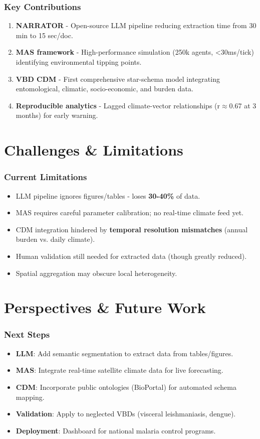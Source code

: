 \documentclass{beamer}
\begin{document}
\begin{frame}
    \frametitle{Key Contributions}
    \begin{enumerate}
        \item \textbf{NARRATOR} - Open-source LLM pipeline reducing extraction time from 30 min to 15 sec/doc.
        \item \textbf{MAS framework} - High-performance simulation (250k agents, <30ms/tick) identifying environmental tipping points.
        \item \textbf{VBD CDM} - First comprehensive star-schema model integrating entomological, climatic, socio-economic, and burden data.
        \item \textbf{Reproducible analytics} - Lagged climate-vector relationships (r$\approx$0.67 at 3 months) for early warning.
    \end{enumerate}
\end{frame}

\section{Challenges \& Limitations}
\begin{frame}
    \frametitle{Current Limitations}
    \begin{itemize}
        \item LLM pipeline ignores figures/tables - loses \textbf{30-40\%} of data.
        \item MAS requires careful parameter calibration; no real-time climate feed yet.
        \item CDM integration hindered by \textbf{temporal resolution mismatches} (annual burden vs. daily climate).
        \item Human validation still needed for extracted data (though greatly reduced).
        \item Spatial aggregation may obscure local heterogeneity.
    \end{itemize}
\end{frame}

\section{Perspectives \& Future Work}
\begin{frame}
    \frametitle{Next Steps}
    \begin{itemize}
        \item \textbf{LLM}: Add semantic segmentation to extract data from tables/figures.
        \item \textbf{MAS}: Integrate real-time satellite climate data for live forecasting.
        \item \textbf{CDM}: Incorporate public ontologies (BioPortal) for automated schema mapping.
        \item \textbf{Validation}: Apply to neglected VBDs (visceral leishmaniasis, dengue).
        \item \textbf{Deployment}: Dashboard for national malaria control programs.
    \end{itemize}
\end{frame}
\end{document}

